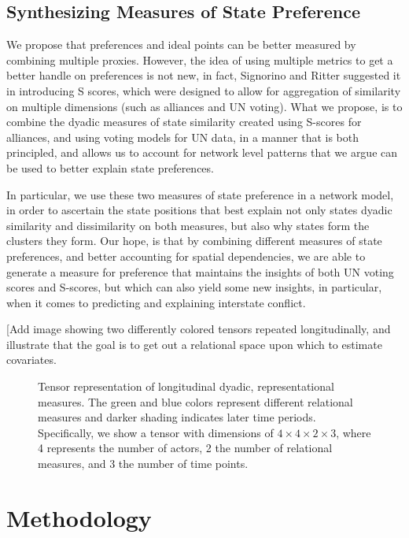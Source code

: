 \subsection*{Synthesizing Measures of State Preference}

We propose that preferences and ideal points can be better measured by combining multiple proxies. However, the idea of using multiple metrics to get a better handle on preferences is not new, in fact, Signorino and Ritter suggested it in introducing S scores, which were designed to allow for aggregation of similarity on multiple dimensions (such as alliances and UN voting). What we propose, is to combine the dyadic measures of state similarity created using S-scores for alliances, and using voting models for UN data, in a manner that is both principled, and allows us to account for network level patterns that we argue can be used to better explain state preferences. 

In particular, we use these two measures of state preference in a network model, in order to ascertain the state positions that best explain not only states dyadic similarity and dissimilarity on both measures, but also why states form the clusters they form. Our hope, is that by combining different measures of state preferences, and better accounting for spatial dependencies, we are able to generate a measure for preference that maintains the insights of both UN voting scores and S-scores, but which can also yield some new insights, in particular, when it comes to predicting and explaining interstate conflict.

[Add image showing two differently colored tensors repeated longitudinally, and illustrate that the goal is to get out a relational space upon which to estimate covariates. 

\begin{figure}[ht]
	\centering
	\resizebox{.5\textwidth}{!}{}
	\caption{Tensor representation of longitudinal dyadic, representational measures. The green and blue colors represent different relational measures and darker shading indicates later time periods. Specifically, we show a tensor with dimensions of $4 \times 4 \times 2 \times 3$, where 4 represents the number of actors, 2 the number of relational measures, and 3 the number of time points.}
	\label{fig:tensViz}
\end{figure}

\section*{Methodology}

